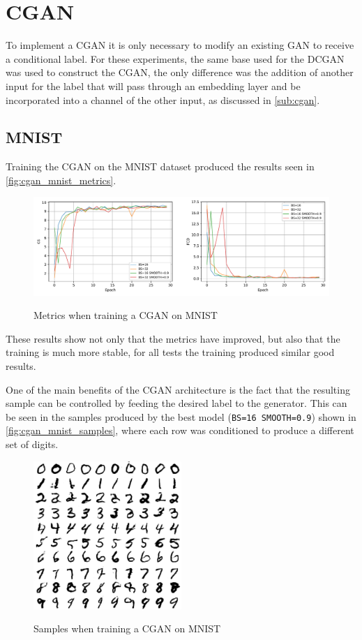 \section{CGAN}
To implement a \gls{CGAN} it is only necessary to modify an existing \gls{GAN} to receive a conditional label. For these experiments, the same base used for the \gls{DCGAN} was used to construct the \gls{CGAN}, the only difference was the addition of another input for the label that will pass through an embedding layer and be incorporated into a channel of the other input, as discussed in \autoref{sub:cgan}.

\subsection{MNIST}
Training the \gls{CGAN} on the \gls{MNIST} dataset produced the results seen in \autoref{fig:cgan_mnist_metrics}.\begin{figure}[hbt]
    \centering
    \caption{Metrics when training a CGAN on MNIST}
    \includegraphics[width=\textwidth]{chapters/Experiments/CGAN/mnist_metrics.pdf}
    \label{fig:cgan_mnist_metrics}
\end{figure}

These results show not only that the metrics have improved, but also that the training is much more stable, for all tests the training produced similar good results.

One of the main benefits of the \gls{CGAN} architecture is the fact that the resulting sample can be controlled by feeding the desired label to the generator. This can be seen in the samples produced by the best model (\texttt{BS=16 SMOOTH=0.9}) shown in \autoref{fig:cgan_mnist_samples}, where each row was conditioned to produce a different set of digits.
\begin{figure}[hbt]
    \centering
    \caption{Samples when training a CGAN on MNIST}
    \includegraphics[width=0.5\textwidth]{chapters/Experiments/CGAN/mnist_samples.png}
    \label{fig:cgan_mnist_samples}
\end{figure}


